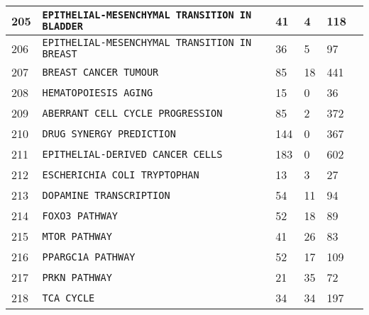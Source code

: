 \documentclass{article}
\begin{document}
\begin{center}
\begin{tabular}{ | C{16pt} | C{149pt} | C{25pt} | C{25pt} | C{25pt} | C{36pt} | }
		 & \texttt{EPITHELIAL-MESENCHYMAL TRANSITION IN BLADDER} & 41 & 4 & 118 & \cite{bbm-205-206} \\
		 & \texttt{EPITHELIAL-MESENCHYMAL TRANSITION IN BREAST} & 36 & 5 & 97 & \cite{bbm-205-206} \\
		 & \texttt{BREAST CANCER TUMOUR} & 85 & 18 & 441 & \cite{bbm-207} \\
		 & \texttt{HEMATOPOIESIS AGING} & 15 & 0 & 36 & \cite{bbm-208} \\
		 & \texttt{ABERRANT CELL CYCLE PROGRESSION} & 85 & 2 & 372 & \cite{bbm-209} \\
		 & \texttt{DRUG SYNERGY PREDICTION} & 144 & 0 & 367 & \cite{bbm-210} \\
		 & \texttt{EPITHELIAL-DERIVED CANCER CELLS} & 183 & 0 & 602 & \cite{bbm-211} \\
		 & \texttt{ESCHERICHIA COLI TRYPTOPHAN} & 13 & 3 & 27 & \cite{bbm-212} \\
		 & \texttt{DOPAMINE TRANSCRIPTION} & 54 & 11 & 94 & \cite{bbm-213-214-215-216-217-218-219} \\
		 & \texttt{FOXO3 PATHWAY} & 52 & 18 & 89 & \cite{bbm-213-214-215-216-217-218-219} \\
		 & \texttt{MTOR PATHWAY} & 41 & 26 & 83 & \cite{bbm-213-214-215-216-217-218-219} \\
		 & \texttt{PPARGC1A PATHWAY} & 52 & 17 & 109 & \cite{bbm-213-214-215-216-217-218-219} \\
		 & \texttt{PRKN PATHWAY} & 21 & 35 & 72 & \cite{bbm-213-214-215-216-217-218-219} \\
		 & \texttt{TCA CYCLE} & 34 & 34 & 197 & \cite{bbm-213-214-215-216-217-218-219} \\
		\hline		
	\end{tabular}


\end{center}
\end{document}
